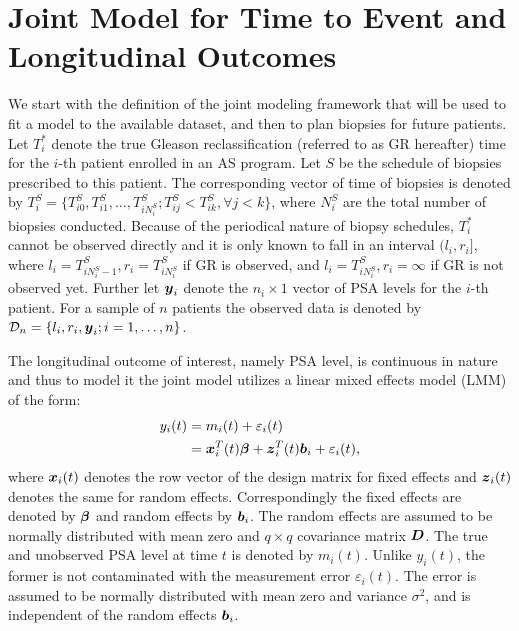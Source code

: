 
\section{Joint Model for Time to Event and Longitudinal Outcomes}
\label{web_sec : jm_framework}
We start with the definition of the joint modeling framework that will be used to fit a model to the available dataset, and then to plan biopsies for future patients. Let $T_i^*$ denote the true Gleason reclassification (referred to as GR hereafter) time for the $i$-th patient enrolled in an AS program. Let $S$ be the schedule of biopsies prescribed to this patient. The corresponding vector of time of biopsies is denoted by $T_i^S = \{T^S_{i0}, T^S_{i1}, \ldots, T^S_{i{N_i^S}}; T^S_{ij} < T^S_{ik}, \forall j<k\}$, where $N_i^S$ are the total number of biopsies conducted. Because of the periodical nature of biopsy schedules, $T_i^*$ cannot be observed directly and it is only known to fall in an interval $(l_i, r_i]$, where $l_i = T^S_{i{N_i^S - 1}}, r_i = T^S_{i{N_i^S}}$ if GR is observed, and $l_i = T^S_{i{N_i^S}}, r_i=\infty$ if GR is not observed yet. Further let $\boldsymbol{y}_i$ denote the $n_i \times 1$  vector of PSA levels for the $i$-th patient. For a sample of $n$ patients the observed data is denoted by $\mathcal{D}_n = \{l_i, r_i, \boldsymbol{y}_i; i = 1, \ldots, n\}$.

The longitudinal outcome of interest, namely PSA level, is continuous in nature and thus to model it the joint model utilizes a linear mixed effects model (LMM) of the form:
\begin{equation*}
\begin{split}
y_i(t) &= m_i(t) + \varepsilon_i(t)\\
&=\boldsymbol{x}_i^T(t) \boldsymbol{\beta} + \boldsymbol{z}_i^T(t) \boldsymbol{b}_i + \varepsilon_i(t),
\end{split}
\end{equation*}
where $\boldsymbol{x}_i(t)$ denotes the row vector of the design matrix for fixed effects and $\boldsymbol{z}_i(t)$ denotes the same for random effects. Correspondingly the fixed effects are denoted by $\boldsymbol{\beta}$ and random effects by $\boldsymbol{b}_i$. The random effects are assumed to be normally distributed with mean zero and $q \times q$ covariance matrix $\boldsymbol{D}$. The true and unobserved PSA level at time $t$ is denoted by $m_i(t)$. Unlike $y_i(t)$, the former is not contaminated with the measurement error $\varepsilon_i(t)$. The error is assumed to be normally distributed with mean zero and variance $\sigma^2$, and is independent of the random effects $\boldsymbol{b}_i$.

